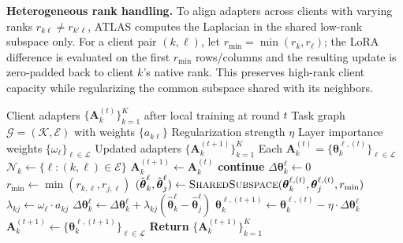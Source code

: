 \documentclass[conference]{IEEEtran}
\begin{document}
\textbf{Heterogeneous rank handling.} To align adapters across clients with varying ranks $r_{k\ell} \neq r_{k'\ell}$, ATLAS computes the Laplacian in the shared low-rank subspace only. For a client pair $(k,\ell)$, let $r_{\min}=\min(r_k,r_\ell)$; the LoRA difference is evaluated on the first $r_{\min}$ rows/columns and the resulting update is zero-padded back to client $k$'s native rank. This preserves high-rank client capacity while regularizing the common subspace shared with its neighbors.

\begin{algorithm}[t]
\caption{Laplacian Regularization with Heterogeneous LoRA Ranks}
\label{alg:laplacian_aggregation}
\begin{algorithmic}[1]
\Require Client adapters $\{\mathbf{A}_k^{(t)}\}_{k=1}^K$ after local training at round $t$
\Require Task graph $\mathcal{G} = (\mathcal{K}, \mathcal{E})$ with weights $\{a_{k\ell}\}$
\Require Regularization strength $\eta$
\Require Layer importance weights $\{\omega_\ell\}_{\ell \in \mathcal{L}}$
\Ensure Updated adapters $\{\mathbf{A}_k^{(t+1)}\}_{k=1}^K$
\State Each $\mathbf{A}_k^{(t)} = \{\boldsymbol{\theta}_k^{\ell,(t)}\}_{\ell \in \mathcal{L}}$ 
  \State $\mathcal{N}_k \leftarrow \{\ell : (k,\ell) \in \mathcal{E}\}$ 
    \State $\mathbf{A}_k^{(t+1)} \leftarrow \mathbf{A}_k^{(t)}$ 
    \State \textbf{continue}
  \EndIf
    \State $\Delta \boldsymbol{\theta}_k^\ell \leftarrow 0$
      \State $r_{\min} \leftarrow \min(r_{k,\ell}, r_{j,\ell})$
      \State $(\hat{\boldsymbol{\theta}}_k^\ell, \hat{\boldsymbol{\theta}}_j^\ell) \leftarrow \textsc{SharedSubspace}(\boldsymbol{\theta}_k^{\ell,(t)}, \boldsymbol{\theta}_j^{\ell,(t)}, r_{\min})$
      \State $\lambda_{kj} \leftarrow \omega_\ell \cdot a_{kj}$
      \State $\Delta \boldsymbol{\theta}_k^\ell \leftarrow \Delta \boldsymbol{\theta}_k^\ell + \lambda_{kj} (\hat{\boldsymbol{\theta}}_k^\ell - \hat{\boldsymbol{\theta}}_j^\ell)$
    \EndFor
    \State $\boldsymbol{\theta}_k^{\ell,(t+1)} \leftarrow \boldsymbol{\theta}_k^{\ell,(t)} - \eta \cdot \Delta \boldsymbol{\theta}_k^\ell$
  \EndFor
  \State $\mathbf{A}_k^{(t+1)} \leftarrow \{\boldsymbol{\theta}_k^{\ell,(t+1)}\}_{\ell \in \mathcal{L}}$
\EndFor
\State \textbf{Return} $\{\mathbf{A}_k^{(t+1)}\}_{k=1}^K$
\end{algorithmic}
\end{algorithm}
\end{document}
